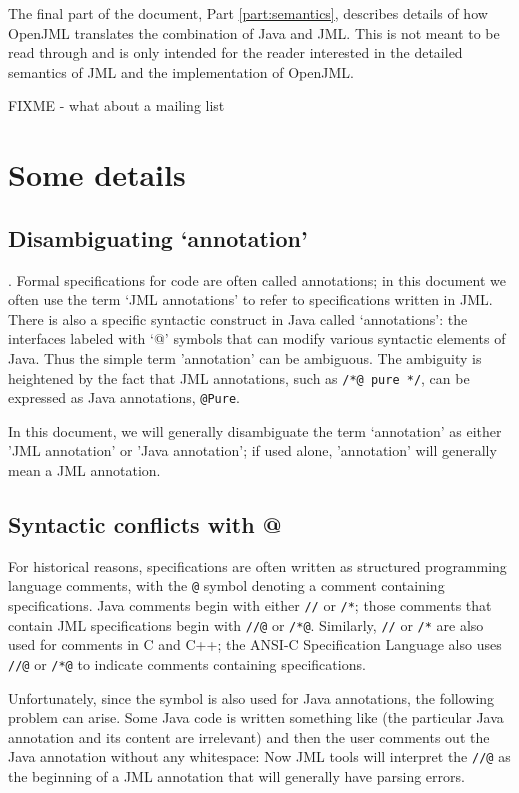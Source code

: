 The final part of the document, Part \ref{part:semantics}, describes details of how OpenJML translates the combination of Java and JML. This is not meant to be read through and is only intended for the reader interested in the detailed semantics of JML and the implementation of OpenJML.

FIXME - what about a mailing list

\chapter{Some details}

\section{Disambiguating `annotation'}. Formal specifications for code are often called annotations; in this document we often
use the term `JML annotations' to refer to specifications written in JML. There is also a specific syntactic construct in Java called 
`annotations': the interfaces labeled with `@' symbols that can modify various syntactic elements of Java. Thus the simple term
'annotation' can be ambiguous. The ambiguity is heightened by the fact that JML annotations, such as \texttt{/*@ pure */}, can 
be expressed as Java annotations, \texttt{@Pure}.

In this document, we will
generally disambiguate the term `annotation' as either 'JML annotation' or 'Java annotation'; if used alone, 'annotation' will generally
mean a JML annotation. 

\section{Syntactic conflicts with @}
For historical reasons, specifications are often written as structured programming language comments, with the \texttt{@} symbol denoting a comment containing specifications. Java comments begin with either \texttt{//} or \texttt{/*}; those comments that
contain JML specifications begin with \texttt{//@} or \texttt{/*@}. 
Similarly, \texttt{//} or \texttt{/*} are also used for comments in C and C++; the ANSI-C Specification Language also uses
\texttt{//@} or \texttt{/*@} to indicate comments containing specifications.

Unfortunately, since the \at symbol is also used for Java annotations, the following problem can arise. Some Java code is written something like (the particular Java annotation and its content are irrelevant)
and then the user comments out the Java annotation without any whitespace:
Now JML tools will interpret the \texttt{//@} as the beginning of a JML annotation that will generally have parsing errors.

